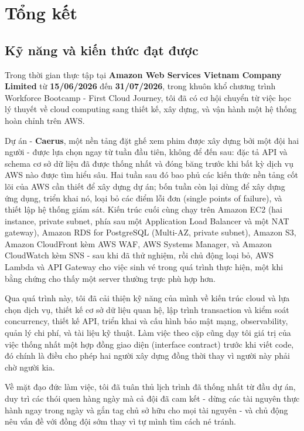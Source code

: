 \documentclass[a4paper,12pt]{article}
\begin{document}
\newpage
\tableofcontents
\newpage





\newpage
\section{Tổng kết}

\subsection{Kỹ năng và kiến thức đạt được}

Trong thời gian thực tập tại \textbf{Amazon Web Services Vietnam Company Limited} từ \textbf{15/06/2026} đến \textbf{31/07/2026}, trong khuôn khổ chương trình Workforce Bootcamp - First Cloud Journey, tôi đã có cơ hội chuyển từ việc học lý thuyết về cloud computing sang thiết kế, xây dựng, và vận hành một hệ thống hoàn chỉnh trên AWS.

Dự án - \textbf{Caerus}, một nền tảng đặt ghế xem phim được xây dựng bởi một đội hai người - được lựa chọn ngay từ tuần đầu tiên, không để đến sau: đặc tả API và schema cơ sở dữ liệu đã được thống nhất và đóng băng trước khi bất kỳ dịch vụ AWS nào được tìm hiểu sâu. Hai tuần sau đó bao phủ các kiến thức nền tảng cốt lõi của AWS cần thiết để xây dựng dự án; bốn tuần còn lại dùng để xây dựng ứng dụng, triển khai nó, loại bỏ các điểm lỗi đơn (single points of failure), và thiết lập hệ thống giám sát. Kiến trúc cuối cùng chạy trên Amazon EC2 (hai instance, private subnet, phía sau một Application Load Balancer và một NAT gateway), Amazon RDS for PostgreSQL (Multi-AZ, private subnet), Amazon S3, Amazon CloudFront kèm AWS WAF, AWS Systems Manager, và Amazon CloudWatch kèm SNS - sau khi đã thử nghiệm, rồi chủ động loại bỏ, AWS Lambda và API Gateway cho việc sinh vé trong quá trình thực hiện, một khi bằng chứng cho thấy một server thường trực phù hợp hơn.

Qua quá trình này, tôi đã cải thiện kỹ năng của mình về kiến trúc cloud và lựa chọn dịch vụ, thiết kế cơ sở dữ liệu quan hệ, lập trình transaction và kiểm soát concurrency, thiết kế API, triển khai và cấu hình bảo mật mạng, observability, quản lý chi phí, và tài liệu kỹ thuật. Làm việc theo cặp cũng dạy tôi giá trị của việc thống nhất một hợp đồng giao diện (interface contract) trước khi viết code, đó chính là điều cho phép hai người xây dựng đồng thời thay vì người này phải chờ người kia.

Về mặt đạo đức làm việc, tôi đã tuân thủ lịch trình đã thống nhất từ đầu dự án, duy trì các thói quen hàng ngày mà cả đội đã cam kết - dừng các tài nguyên thực hành ngay trong ngày và gắn tag chủ sở hữu cho mọi tài nguyên - và chủ động nêu vấn đề với đồng đội sớm thay vì tự mình tìm cách né tránh.
\end{document}

